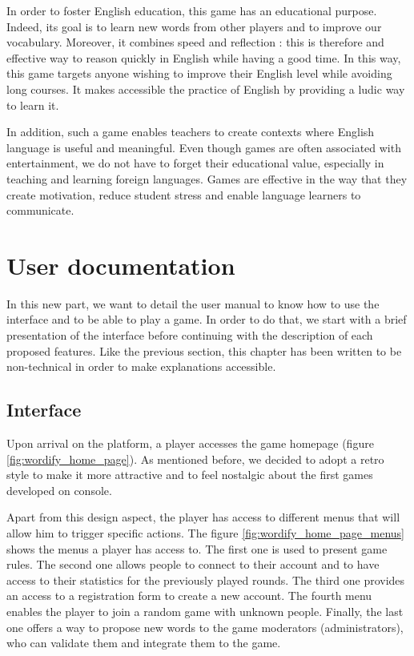 \documentclass{tnreport}
\begin{document}
In order to foster English education, this game has an educational purpose. Indeed, its goal is to learn new words from other players and to improve our vocabulary. Moreover, it combines speed and reflection : this is therefore and effective way to reason quickly in English while having a good time. In this way, this game targets anyone wishing to improve their English level while avoiding long courses. It makes accessible the practice of English by providing a ludic way to learn it. 

In addition, such a game enables teachers to create contexts where English language is useful and meaningful. Even though games are often associated with entertainment, we do not have to forget their educational value, especially in teaching and learning foreign languages. Games are effective in the way that they create motivation, reduce student stress and enable language learners to communicate.

\cleardoublepage

\chapter{User documentation}

In this new part, we want to detail the user manual to know how to use the interface and to be able to play a game. In order to do that, we start with a brief presentation of the interface before continuing with the description of each proposed features. Like the previous section, this chapter has been written to be non-technical in order to make explanations accessible. 

\section{Interface}

Upon arrival on the platform, a player accesses the game homepage (figure \ref{fig:wordify_home_page}). As mentioned before, we decided to adopt a retro style to make it more attractive and to feel nostalgic about the first games developed on console. 

Apart from this design aspect, the player has access to different menus that will allow him to trigger specific actions. The figure \ref{fig:wordify_home_page_menus} shows the menus a player has access to.  The first one is used to present game rules. The second one allows people to connect to their account and to have access to their statistics for the previously played rounds. The third one provides an access to a registration form to create a new account. The fourth menu enables the player to join a random game with unknown people. Finally, the last one offers a way to propose new words to the game moderators (administrators), who can validate them and integrate them to the game. 
\end{document}
